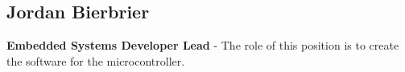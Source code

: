 \documentclass[12pt, titlepage]{article}
\begin{document}
\begin{comment}
\begin{table}[]
	\centering
	\begin{tabular}{| m{5em} | m{4cm}| m{5cm} |}
	\hline
	Member						 & Role                                           & Description                                                                                                                                                                                                                \\ \hline
	Abraham Taha                 & Application Developer                          & This position is focused on creating a web application for the end user. This will allow the end user to interface with the hardware and change the sounds to detect.  \\ \hline
	Jordan Bierbrier             & Signal Processing / Embedded Systems Developer &                                                                                                                                                                                                      \\ \hline
	Taranjit Lotey               & Application Developer                          & Communication between application and hardware / backend development to send physical signals to user                                                                                                                      \\ \hline
	Azriel Gingoyon              & Hardware Developer                             & Cost-effective component research, wristband design, motor/microcontroller integration                                                                                                                                     \\ \hline
	Udeep Shah                   & Signal Processing / Embedded Systems Developer & Noise filtering, signal isolation resource optimization and power optimization                                                                                                                      \\ \hline
	\end{tabular}
\end{table}
\end{comment}

\subsection*{Jordan Bierbrier}
\textbf{Embedded Systems Developer Lead} - The role of this position is to create the software for the microcontroller.
\end{document}
